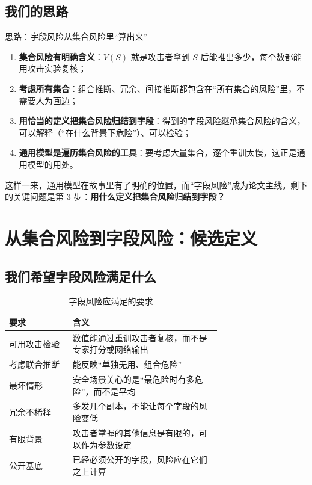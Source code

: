 \documentclass[zihao=-4,a4paper]{ctexart}
\begin{document}
\subsection{我们的思路}

\begin{stepbox}{思路：字段风险从集合风险里“算出来”}
\begin{enumerate}[leftmargin=*]
  \item \textbf{集合风险有明确含义}：$V(S)$ 就是攻击者拿到 $S$ 后能推出多少，每个数都能用攻击实验复核；
  \item \textbf{考虑所有集合}：组合推断、冗余、间接推断都包含在“所有集合的风险”里，不需要人为画边；
  \item \textbf{用恰当的定义把集合风险归结到字段}：得到的字段风险继承集合风险的含义，可以解释（“在什么背景下危险”）、可以检验；
  \item \textbf{通用模型是遍历集合风险的工具}：要考虑大量集合，逐个重训太慢，这正是通用模型的用处。
\end{enumerate}
\end{stepbox}

这样一来，通用模型在故事里有了明确的位置，而“字段风险”成为论文主线。剩下的关键问题是第 3 步：\textbf{用什么定义把集合风险归结到字段？}

\section{从集合风险到字段风险：候选定义}

\subsection{我们希望字段风险满足什么}

\begin{table}[H]\centering
\caption{字段风险应满足的要求}
\small
\begin{tabular}{lp{0.7\linewidth}}
\toprule
要求 & 含义 \\
\midrule
可用攻击检验 & 数值能通过重训攻击者复核，而不是专家打分或网络输出 \\
考虑联合推断 & 能反映“单独无用、组合危险” \\
最坏情形 & 安全场景关心的是“最危险时有多危险”，而不是平均 \\
冗余不稀释 & 多发几个副本，不能让每个字段的风险变低 \\
有限背景 & 攻击者掌握的其他信息是有限的，可以作为参数设定 \\
公开基底 & 已经必须公开的字段，风险应在它们之上计算 \\
\bottomrule
\end{tabular}
\end{table}
\end{document}
